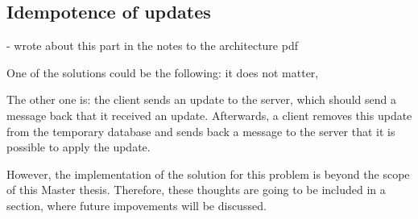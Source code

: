 \subsection*{Idempotence of updates}

- wrote about this part in the notes to the architecture pdf



One of the solutions could be the following: it does not matter, 

The other one is: the client sends an update to the server, which should send a message back that it received an update. Afterwards, a client removes this update from the temporary database and sends back a message to the server that it is possible to apply the update.

However, the implementation of the solution for this problem is beyond the scope of this Master thesis. Therefore, these thoughts are going to be included in a section, where future impovements will be discussed.